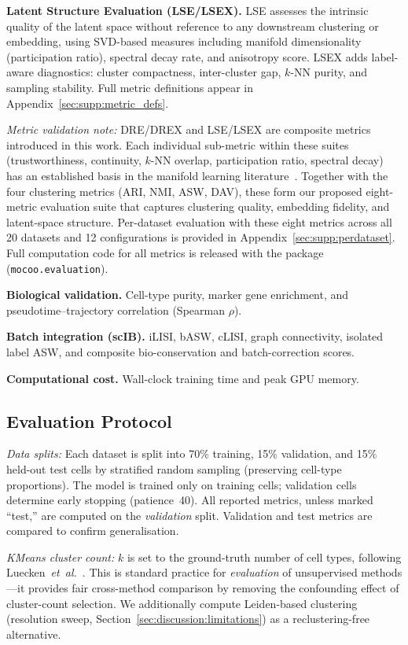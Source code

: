 \documentclass[biology,article,submit,pdftex]{Definitions/mdpi}
\begin{document}
\textbf{Latent Structure Evaluation (LSE/LSEX).}
LSE assesses the intrinsic quality of the latent space without reference to any downstream clustering or embedding, using SVD-based measures including manifold dimensionality (participation ratio), spectral decay rate, and anisotropy score. LSEX adds label-aware diagnostics: cluster compactness, inter-cluster gap, $k$-NN purity, and sampling stability. Full metric definitions appear in Appendix~\ref{sec:supp:metric_defs}.

\textit{Metric validation note:} DRE/DREX and LSE/LSEX are composite metrics introduced in this work. Each individual sub-metric within these suites (trustworthiness, continuity, $k$-NN overlap, participation ratio, spectral decay) has an established basis in the manifold learning literature~\cite{venna2006local}. Together with the four clustering metrics (ARI, NMI, ASW, DAV), these form our proposed eight-metric evaluation suite that captures clustering quality, embedding fidelity, and latent-space structure. Per-dataset evaluation with these eight metrics across all 20 datasets and 12 configurations is provided in Appendix~\ref{sec:supp:perdataset}. Full computation code for all metrics is released with the package (\texttt{mocoo.evaluation}).

\textbf{Biological validation.} Cell-type purity, marker gene enrichment, and pseudotime--trajectory correlation (Spearman $\rho$).

\textbf{Batch integration (scIB).} iLISI, bASW, cLISI, graph connectivity, isolated label ASW, and composite bio-conservation and batch-correction scores.

\textbf{Computational cost.} Wall-clock training time and peak GPU memory.

\subsection{Evaluation Protocol}
\label{sec:experiments:protocol}

\textit{Data splits:} Each dataset is split into 70\% training, 15\% validation, and 15\% held-out test cells by stratified random sampling (preserving cell-type proportions). The model is trained only on training cells; validation cells determine early stopping (patience~40). All reported metrics, unless marked ``test,'' are computed on the \textit{validation} split. Validation and test metrics are compared to confirm generalisation.

\textit{KMeans cluster count:} $k$ is set to the ground-truth number of cell types, following Luecken~\textit{et~al.}~\cite{luecken2022scib}. This is standard practice for \textit{evaluation} of unsupervised methods---it provides fair cross-method comparison by removing the confounding effect of cluster-count selection. We additionally compute Leiden-based clustering~\cite{traag2019leiden} (resolution sweep, Section~\ref{sec:discussion:limitations}) as a reclustering-free alternative.
\end{document}
